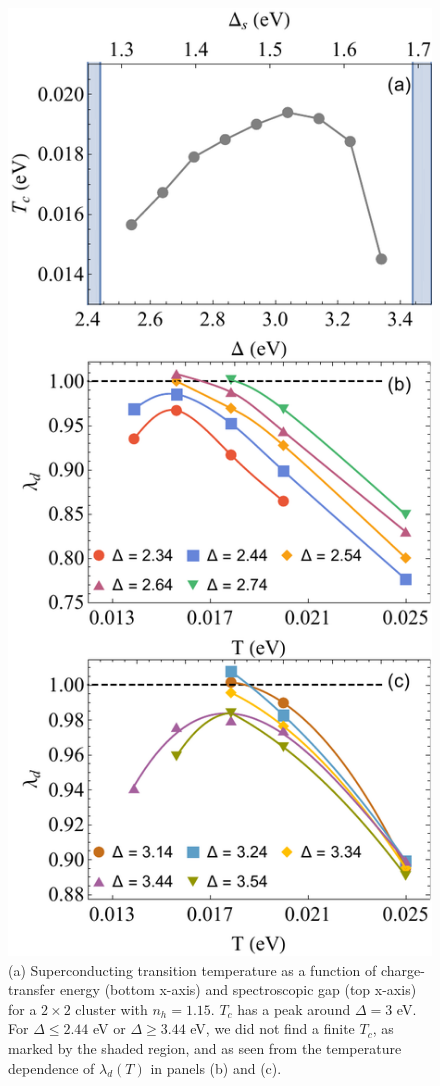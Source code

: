 \documentclass[reprint,nofootinbib,nobibnotes,amsmath,amssymb,aps,prb,floatfix]{revtex4-1}
\begin{document}
\begin{figure}[ht]
\includegraphics[width=0.88\linewidth]{./Figures/2by2TcvaryCTE.pdf}
\caption{(a) Superconducting transition temperature as a function of charge-transfer energy (bottom x-axis) and spectroscopic gap (top x-axis) for a $2\times2$ cluster with $n_h=1.15$. $T_c$ has a peak around $\Delta=3$ eV. For $\Delta \le 2.44$ eV or $\Delta \ge 3.44$ eV, we did not find a finite $T_c$, as marked by the shaded region, and as seen from the temperature dependence of $\lambda_d(T)$ in panels (b) and (c).
}
\label{vsdelta}
\end{figure}
\end{document}
